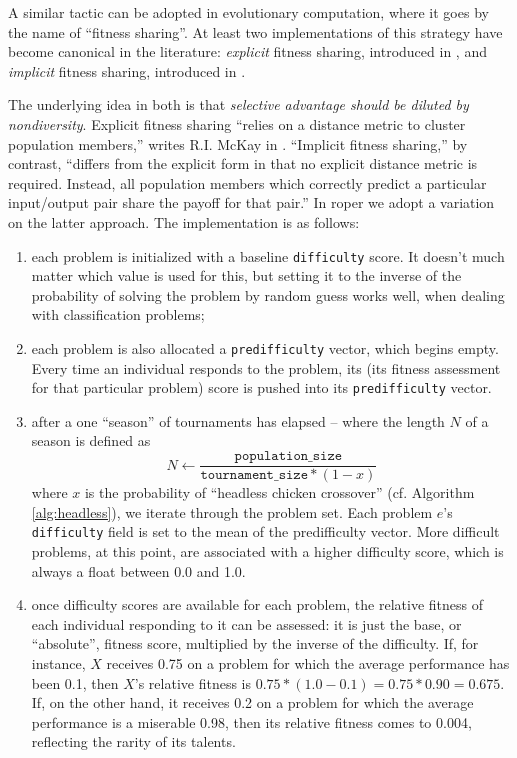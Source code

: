 \documentclass[12pt,glossary]{dalthesis}
\begin{document}
A similar tactic can be adopted in evolutionary computation, where it goes by
the name of ``fitness sharing''. At least two implementations of this strategy
have become canonical in the literature: \emph{explicit} fitness sharing, introduced
in \cite{deb89}, and \emph{implicit} fitness sharing, introduced in \cite{smith92}.

The underlying idea in both is that \emph{selective advantage should be diluted by
nondiversity}. Explicit fitness sharing ``relies on a distance metric to cluster
population members,'' writes R.I. McKay in \cite{mckay00}. ``Implicit fitness sharing,''
by contrast, ``differs from the explicit form in that no explicit distance metric
is required. Instead, all population members which correctly predict a particular
input/output pair share the payoff for that pair.'' 
In \gls{roper} we adopt a variation on the latter approach. The implementation is as
follows:

\begin{enumerate}
\item each problem is initialized with a baseline
\texttt{difficulty} score. It doesn't much matter which value is used for this,
but setting it to the inverse of the probability of solving the problem 
by random guess works well, when dealing with classification problems;

\item each problem is also allocated a \texttt{predifficulty} vector, which begins empty.
Every time an individual responds to the problem, its (its fitness assessment
for that particular problem) score is pushed into its \texttt{predifficulty} vector.

\item after a one ``season'' of tournaments has elapsed -- where the length \(N\) 
of a season is defined as
$$N \gets \frac{\texttt{population\_size}}{\texttt{tournament\_size} * (1 - x)}$$
where \(x\) is the probability of ``headless chicken crossover'' (cf. Algorithm
\ref{alg:headless}), we iterate through the problem set. 
Each problem \(e\)'s \texttt{difficulty} field is set to the mean of the predifficulty
vector. More difficult problems, at this point, are associated with a higher
difficulty score, which is always a float between 0.0 and 1.0.

\item once difficulty scores are available for each problem, the relative fitness of
each individual responding to it can be assessed: it is just the base, or ``absolute'',
fitness score, multiplied by the inverse of the difficulty. If, for instance, 
\(X\) receives 0.75 on a problem for which the average performance has been
0.1, then \(X\)'s relative fitness is \(0.75 * (1.0 - 0.1) = 0.75 * 0.90 = 0.675\).
If, on the other hand, it receives 0.2 on a problem for which the average performance
is a miserable 0.98, then its relative fitness comes to 0.004, reflecting the
rarity of its talents.
\end{enumerate}
\end{document}
